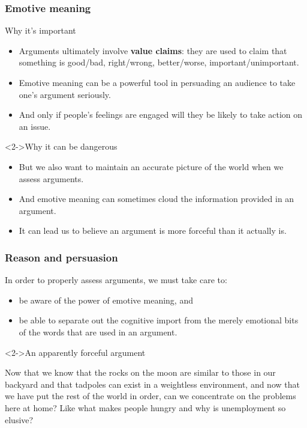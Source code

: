 \documentclass[10pt,letterpaper,xcolor=dvipsnames,handout]{beamer}
\begin{document}
\begin{frame}
  \frametitle{Emotive meaning}
  
  \begin{block}{Why it's important}
    \begin{itemize}
      \item Arguments ultimately involve \textbf{value claims}: they are used to claim that something is good/bad, right/wrong, better/worse, important/unimportant.
      \item Emotive meaning can be a powerful tool in persuading an audience to take one's argument seriously.
      \item And only if people's feelings are engaged will they be likely to take action on an issue.
    \end{itemize}
  \end{block}
  
  \begin{block}<2->{Why it can be dangerous}
    \begin{itemize}
      \item But we also want to maintain an accurate picture of the world when we assess arguments.
      \item And emotive meaning can sometimes cloud the information provided in an argument.
      \item It can lead us to believe an argument is more forceful than it actually is.
    \end{itemize}
  \end{block}
  
\end{frame}

\begin{frame}
\frametitle{Reason and persuasion}

  In order to properly assess arguments, we must take care to:
  \begin{itemize}
    \item be aware of the power of emotive meaning, and
    \item be able to separate out the cognitive import from the merely emotional bits of the words that are used in an argument.
  \end{itemize}  

\begin{block}<2->{An apparently forceful argument}

Now that we know that the rocks on the moon are similar to those in our backyard and that tadpoles can exist in a weightless environment, and now that we have put the rest of the world in order, can we concentrate on the problems here at home? Like what makes people hungry and why is unemployment so elusive?

\end{block}

\end{frame}
\end{document}
